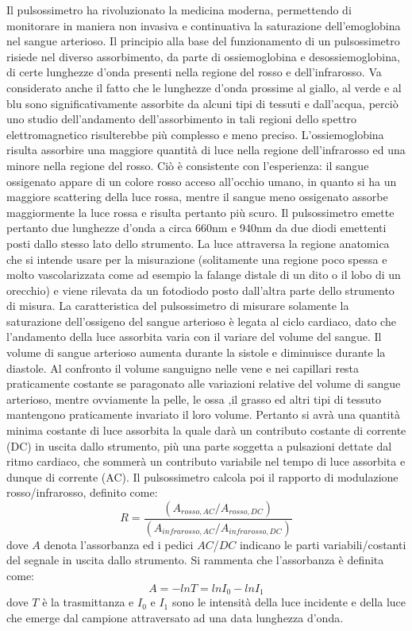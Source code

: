 \documentclass[12pt,a4paper, twoside, openright]{report}
\begin{document}
Il pulsossimetro ha rivoluzionato la medicina moderna, permettendo di monitorare in maniera non invasiva e continuativa la saturazione dell'emoglobina nel sangue arterioso. 
Il principio alla base del funzionamento di un pulsossimetro risiede nel diverso assorbimento, da parte di ossiemoglobina e desossiemoglobina, di certe lunghezze d'onda presenti nella regione del rosso e dell'infrarosso. 
Va considerato anche il fatto che le lunghezze d'onda prossime al giallo, al verde e al blu sono significativamente assorbite da alcuni tipi di tessuti e dall'acqua, perciò uno studio dell'andamento dell'assorbimento in tali regioni dello spettro elettromagnetico risulterebbe più complesso e meno preciso. 
L'ossiemoglobina risulta assorbire una maggiore quantità di luce nella regione dell'infrarosso ed una minore nella regione del rosso. 
Ciò è consistente con l'esperienza: il sangue ossigenato appare di un colore rosso acceso all'occhio umano, in quanto si ha un maggiore scattering della luce rossa, mentre il sangue meno ossigenato assorbe maggiormente la luce rossa e risulta pertanto più scuro. 
Il pulsossimetro emette pertanto due lunghezze d'onda a circa 660nm e 940nm da due diodi emettenti posti dallo stesso lato dello strumento. 
La luce attraversa la regione anatomica che si intende usare per la misurazione (solitamente una regione poco spessa e molto vascolarizzata come ad esempio la falange distale di un dito o il lobo di un orecchio) e viene rilevata da un fotodiodo posto dall'altra parte dello strumento di misura. 
La caratteristica del pulsossimetro di misurare solamente la saturazione dell'ossigeno del sangue arterioso è legata al ciclo cardiaco, dato che l'andamento della luce assorbita varia con il variare del volume del sangue. 
Il volume di sangue arterioso aumenta durante la sistole e diminuisce durante la diastole. 
Al confronto il volume sanguigno nelle vene e nei capillari resta praticamente costante se paragonato alle variazioni relative del volume di sangue arterioso, mentre ovviamente la pelle, le ossa ,il grasso ed altri tipi di tessuto mantengono praticamente invariato il loro volume. 
Pertanto si avrà una quantità minima costante di luce assorbita la quale darà un contributo costante di corrente (DC) in uscita dallo strumento, più una parte soggetta a pulsazioni dettate dal ritmo cardiaco, che sommerà un contributo variabile nel tempo di luce assorbita e dunque di corrente (AC). 
Il pulsossimetro calcola poi il rapporto di modulazione rosso/infrarosso, definito come:
\begin{equation}
    \label{eq:R}
    R=\frac{(A_{rosso,AC}/A_{rosso,DC})}{(A_{infrarosso,AC}/A_{infrarosso,DC})}
\end{equation}
dove $A$ denota l'assorbanza ed i pedici $AC$/$DC$ indicano le parti variabili/costanti del segnale in uscita dallo strumento. 
Si rammenta che l'assorbanza è definita come:
\begin{equation}
    \label{eq:Absorbance}
    A = -ln T = ln I_{0} - ln I_{1}
\end{equation}
dove $T$ è la trasmittanza e $I_{0}$ e $I_{1}$ sono le intensità della luce incidente e della luce che emerge dal campione attraversato ad una data lunghezza d'onda. 
\newline
\end{document}
